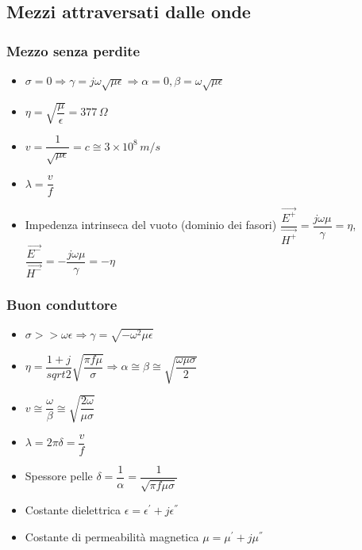\documentclass{article}
\begin{document}
\subsection{Mezzi attraversati dalle onde}
\subsubsection{Mezzo senza perdite}
\begin{itemize}
	\item \( \sigma = 0 \Rightarrow \gamma = j \omega \sqrt{\mu \epsilon} \Rightarrow \alpha = 0, \beta = \omega \sqrt{\mu \epsilon} \) 
	\item \( \eta = \sqrt{\dfrac{\mu}{\epsilon}}  = 377 \, \Omega \)
	\item \( v = \dfrac{1}{\sqrt{\mu \epsilon}} = c \cong 3\times10^8 \, m/s \)
	\item \( \lambda = \dfrac{v}{f} \)
	\item Impedenza intrinseca del vuoto (dominio dei fasori) \( \dfrac{\vec{E^+}}{\vec{H^+}} = \dfrac{j \omega \mu}{\gamma} = \eta \), \(\dfrac{\vec{E^-}}{\vec{H^-}} = - \dfrac{j \omega \mu}{\gamma} = - \eta\) 
\end{itemize}

\subsubsection{Buon conduttore}
\begin{itemize}
	\item \( \sigma >> \omega \epsilon \Rightarrow \gamma = \sqrt{-\omega^2 \mu \epsilon} \)
	\item \( \eta = \dfrac{1+j}{sqrt{2}} \sqrt{\dfrac{\pi f \mu}{\sigma}} \Rightarrow \alpha \cong \beta
	\cong \sqrt{\dfrac{\omega \mu \sigma}{2}} \)
	\item \( v \cong \dfrac{\omega}{\beta} \cong \sqrt{\dfrac{2 \omega}{\mu \sigma}} \)
	\item \( \lambda = 2 \pi \delta = \dfrac{v}{f} \)
	\item Spessore pelle \( \delta = \dfrac{1}{\alpha} = \dfrac{1}{\sqrt{\pi f \mu \sigma}} \)
	\item Costante dielettrica \( \epsilon = \epsilon ^ { ' } + j \epsilon ^ { '' } \)
	\item Costante di permeabilità magnetica \( \mu = \mu ^ { ' } + j \mu ^ { '' } \)
\end{itemize}

\newpage
\end{document}
